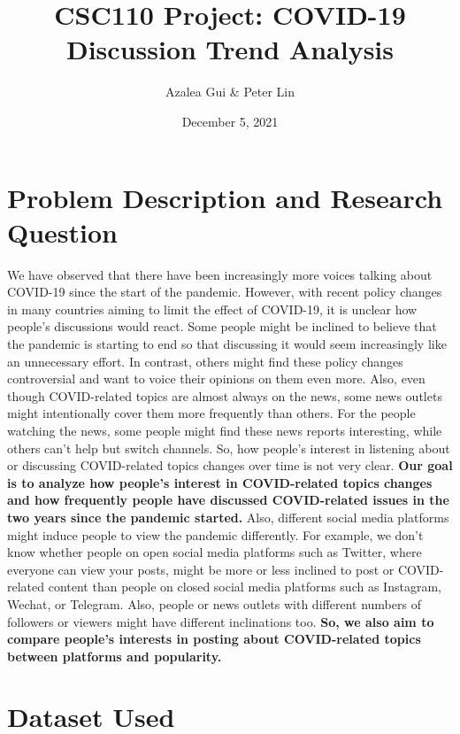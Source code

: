 \documentclass{article}
\title{CSC110 Project: COVID-19 Discussion Trend Analysis}
\author{Azalea Gui \& Peter Lin}
\date{December 5, 2021}
\begin{document}
    \maketitle

    \section{Problem Description and Research Question}
    \indent

    We have observed that there have been increasingly more voices talking about COVID-19 since the start of the pandemic. However, with recent policy changes in many countries aiming to limit the effect of COVID-19, it is unclear how people’s discussions would react. Some people might be inclined to believe that the pandemic is starting to end so that discussing it would seem increasingly like an unnecessary effort. In contrast, others might find these policy changes controversial and want to voice their opinions on them even more. Also, even though COVID-related topics are almost always on the news, some news outlets might intentionally cover them more frequently than others. For the people watching the news, some people might find these news reports interesting, while others can’t help but switch channels. So, how people’s interest in listening about or discussing COVID-related topics changes over time is not very clear. \textbf{Our goal is to analyze how people’s interest in COVID-related topics changes and how frequently people have discussed COVID-related issues in the two years since the pandemic started.} Also, different social media platforms might induce people to view the pandemic differently. For example, we don’t know whether people on open social media platforms such as Twitter, where everyone can view your posts, might be more or less inclined to post or COVID-related content than people on closed social media platforms such as Instagram, Wechat, or Telegram. Also, people or news outlets with different numbers of followers or viewers might have different inclinations too. \textbf{So, we also aim to compare people’s interests in posting about COVID-related topics between platforms and popularity.}

    \section{Dataset Used}
    \indent
\end{document}

